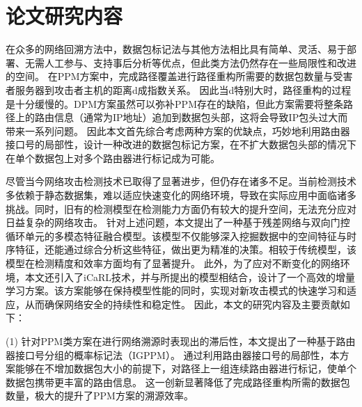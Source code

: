 \section{论文研究内容}
在众多的网络回溯方法中，数据包标记法与其他方法相比具有简单、灵活、易于部署、无需人工参与、支持事后分析等优点，但此类方法仍然存在一些局限性和改进的空间。
在PPM方案中，完成路径覆盖进行路径重构所需要的数据包数量与受害者服务器到攻击者主机的距离d成指数关系。
因此当d特别大时，路径重构的过程是十分缓慢的。DPM方案虽然可以弥补PPM存在的缺陷，但此方案需要将整条路径上的路由信息（通常为IP地址）追加到数据包头部，这将会导致IP包头过大而带来一系列问题。
因此本文首先综合考虑两种方案的优缺点，巧妙地利用路由器接口号的局部性，设计一种改进的数据包标记方案，在不扩大数据包头部的情况下在单个数据包上对多个路由器进行标记成为可能。\par

尽管当今网络攻击检测技术已取得了显著进步，但仍存在诸多不足。当前检测技术多依赖于静态数据集，难以适应快速变化的网络环境，导致在实际应用中面临诸多挑战。同时，旧有的检测模型在检测能力方面仍有较大的提升空间，无法充分应对日益复杂的网络攻击。
针对上述问题，本文提出了一种基于残差网络与双向门控循环单元的多模态特征融合模型。该模型不仅能够深入挖掘数据中的空间特征与时序特征，还能通过综合分析这些特征，做出更为精准的决策。相较于传统模型，该模型在检测精度和效率方面均有了显著提升。
此外，为了应对不断变化的网络环境，本文还引入了iCaRL技术，并与所提出的模型相结合，设计了一个高效的增量学习方案。该方案能够在保持模型性能的同时，实现对新攻击模式的快速学习和适应，从而确保网络安全的持续性和稳定性。
因此，本文的研究内容及主要贡献如下：\par

(1)  针对PPM类方案在进行网络溯源时表现出的滞后性，本文提出了一种基于路由器接口号分组的概率标记法（IGPPM）。
通过利用路由器接口号的局部性，本方案能够在不增加数据包大小的前提下，对路径上一组连续路由器进行标记，使单个数据包携带更丰富的路由信息。
这一创新显著降低了完成路径重构所需的数据包数量，极大的提升了PPM方案的溯源效率。\par

